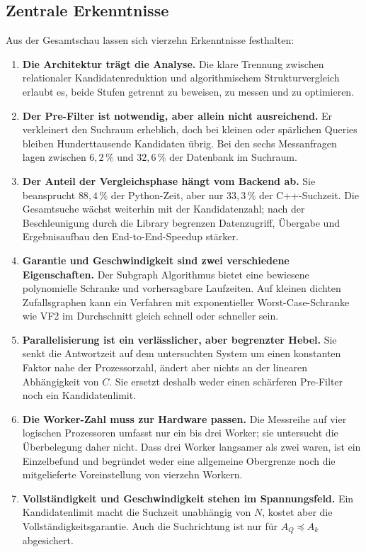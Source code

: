\documentclass[a4paper,12pt, twoside]{report}
\theoremstyle{definition}
\begin{document}
\subsection{Zentrale Erkenntnisse}

Aus der Gesamtschau lassen sich vierzehn Erkenntnisse festhalten:

\begin{enumerate}
	\item \textbf{Die Architektur trägt die Analyse.} Die klare Trennung zwischen relationaler Kandidatenreduktion und algorithmischem Strukturvergleich erlaubt es, beide Stufen getrennt zu beweisen, zu messen und zu optimieren.
	\item \textbf{Der Pre-Filter ist notwendig, aber allein nicht ausreichend.} Er verkleinert den Suchraum erheblich, doch bei kleinen oder spärlichen Queries bleiben Hunderttausende Kandidaten übrig. Bei den sechs Messanfragen lagen zwischen $6{,}2\,\%$ und $32{,}6\,\%$ der Datenbank im Suchraum.
	\item \textbf{Der Anteil der Vergleichsphase hängt vom Backend ab.} Sie beansprucht $88{,}4\,\%$ der Python-Zeit, aber nur $33{,}3\,\%$ der C++-Suchzeit. Die Gesamtsuche wächst weiterhin mit der Kandidatenzahl; nach der Beschleunigung durch die Library begrenzen Datenzugriff, Übergabe und Ergebnisaufbau den End-to-End-Speedup stärker.
	\item \textbf{Garantie und Geschwindigkeit sind zwei verschiedene Eigenschaften.} Der Subgraph Algorithmus bietet eine bewiesene polynomielle Schranke und vorhersagbare Laufzeiten. Auf kleinen dichten Zufallsgraphen kann ein Verfahren mit exponentieller Worst-Case-Schranke wie VF2 im Durchschnitt gleich schnell oder schneller sein.
	\item \textbf{Parallelisierung ist ein verlässlicher, aber begrenzter Hebel.} Sie senkt die Antwortzeit auf dem untersuchten System um einen konstanten Faktor nahe der Prozessorzahl, ändert aber nichts an der linearen Abhängigkeit von $C$. Sie ersetzt deshalb weder einen schärferen Pre-Filter noch ein Kandidatenlimit.
	\item \textbf{Die Worker-Zahl muss zur Hardware passen.} Die Messreihe auf vier logischen Prozessoren umfasst nur ein bis drei Worker; sie untersucht die Überbelegung daher nicht. Dass drei Worker langsamer als zwei waren, ist ein Einzelbefund und begründet weder eine allgemeine Obergrenze noch die mitgelieferte Voreinstellung von vierzehn Workern.
	\item \textbf{Vollständigkeit und Geschwindigkeit stehen im Spannungsfeld.} Ein Kandidatenlimit macht die Suchzeit unabhängig von $N$, kostet aber die Vollständigkeitsgarantie. Auch die Suchrichtung ist nur für $A_Q \preceq A_k$ abgesichert.

\end{enumerate}
\end{document}

